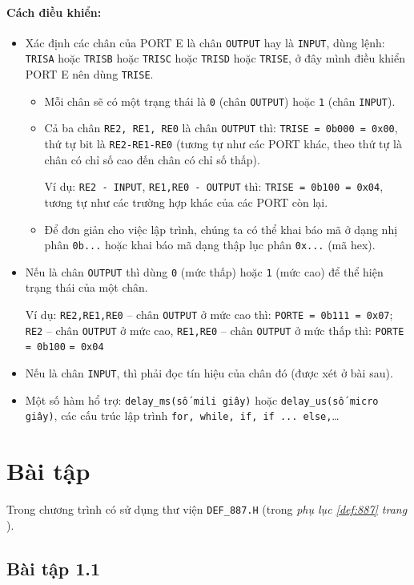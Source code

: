 \paragraph{Cách điều khiển:}
\begin{itemize}
\item Xác định các chân của PORT E là chân \verb|OUTPUT| hay là \verb|INPUT|, dùng lệnh: \verb|TRISA| hoặc \verb|TRISB| hoặc \verb|TRISC| hoặc \verb|TRISD| hoặc \verb|TRISE|, ở đây mình điều khiển PORT E nên dùng \verb|TRISE|.
\begin{itemize}
\item Mỗi chân sẽ có một trạng thái là \verb|0| (chân \verb|OUTPUT|) hoặc \verb|1| (chân \verb|INPUT|).
\item Cả ba chân \verb|RE2, RE1, RE0| là chân \verb|OUTPUT| thì: \verb|TRISE = 0b000 = 0x00|, thứ tự bit là \verb|RE2-RE1-RE0| (tương tự như các PORT khác, theo thứ tự là chân có chỉ số cao đến chân có chỉ số thấp).

Ví dụ: \verb|RE2 - INPUT|, \verb|RE1,RE0 - OUTPUT| thì: \verb|TRISE = 0b100 = 0x04|, tương tự như các trường hợp khác của các PORT còn lại.
\item Để đơn giản cho việc lập trình, chúng ta có thể khai báo mã ở dạng nhị phân \verb|0b...| hoặc khai báo mã dạng thập lục phân \verb|0x...| (mã hex).
\end{itemize}
\item Nếu là chân \verb|OUTPUT| thì dùng \verb|0| (mức thấp) hoặc \verb|1| (mức cao) để thể hiện trạng thái của một chân.

Ví dụ: \verb|RE2,RE1,RE0| -- chân \verb|OUTPUT| ở mức cao thì: \verb|PORTE = 0b111 = 0x07|; \verb|RE2| -- chân \verb|OUTPUT| ở mức cao, \verb|RE1,RE0| -- chân \verb|OUTPUT| ở mức thấp thì: \verb|PORTE = 0b100| \verb|= 0x04| 
\item Nếu là chân \verb|INPUT|, thì phải đọc tín hiệu của chân đó (được xét ở bài sau).
\item Một số hàm hổ trợ: \verb|delay_ms(số mili giây)| hoặc \verb|delay_us(số micro giây)|, các cấu trúc lập trình \verb|for, while, if, if ... else,|\ldots
\end{itemize}
\section{Bài tập}
Trong chương trình có sử dụng thư viện \verb|DEF_887.H| (trong \emph{phụ lục \ref{def:887} trang \pageref{def:887}}).
\subsection{Bài tập 1.1}
